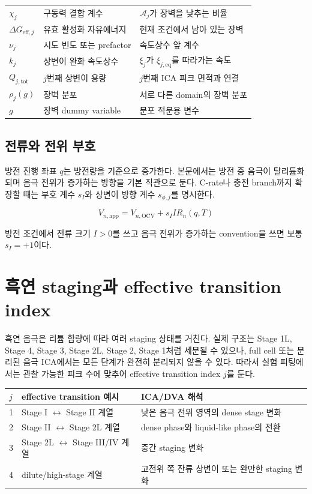\documentclass[11pt,a4paper]{article}
\newcommand{\OCV}{\mathrm{OCV}}
\newcommand{\app}{\mathrm{app}}
\newcommand{\eff}{\mathrm{eff}}
\newcommand{\eq}{\mathrm{eq}}
\newcommand{\tot}{\mathrm{tot}}
\begin{document}
\begin{longtable}{p{}p{}p{}}
\(\chi_j\) & 구동력 결합 계수 & \(\mathcal A_j\)가 장벽을 낮추는 비율 \\
\(\Delta G_{\eff,j}\) & 유효 활성화 자유에너지 & 현재 조건에서 남아 있는 장벽 \\
\(\nu_j\) & 시도 빈도 또는 prefactor & 속도상수 앞 계수 \\
\(k_j\) & 상변이 완화 속도상수 & \(\xi_j\)가 \(\xi_{j,\eq}\)를 따라가는 속도 \\
\(Q_{j,\tot}\) & \(j\)번째 상변이 용량 & \(j\)번째 ICA 피크 면적과 연결 \\
\(\rho_j(g)\) & 장벽 분포 & 서로 다른 domain의 장벽 분포 \\
\(g\) & 장벽 dummy variable & 분포 적분용 변수 \\
\bottomrule
\end{longtable}

\subsection{전류와 전위 부호}
방전 진행 좌표 \(q\)는 방전량을 기준으로 증가한다. 본문에서는 방전 중 음극이 탈리튬화되며 음극 전위가 증가하는 방향을 기본 직관으로 둔다. C-rate나 충전 branch까지 확장할 때는 부호 계수 \(s_I\)와 상변이 방향 계수 \(s_{\phi,j}\)를 명시한다.

\begin{equation}
V_{n,\app}=V_{n,\OCV}+s_IIR_n(q,T)
\label{eq:Vapp_general}
\end{equation}

방전 조건에서 전류 크기 \(I>0\)를 쓰고 음극 전위가 증가하는 convention을 쓰면 보통 \(s_I=+1\)이다.

\section{흑연 staging과 effective transition index}
흑연 음극은 리튬 함량에 따라 여러 staging 상태를 거친다. 실제 구조는 Stage 1L, Stage 4, Stage 3, Stage 2L, Stage 2, Stage 1처럼 세분될 수 있으나, full cell 또는 분리된 음극 ICA에서는 모든 단계가 완전히 분리되지 않을 수 있다. 따라서 실험 피팅에서는 관찰 가능한 피크 수에 맞추어 effective transition index \(j\)를 둔다.

\begin{longtable}{p{}p{}p{}}
\toprule
\(j\) & effective transition 예시 & ICA/DVA 해석 \\
\midrule
\endhead
1 & Stage I \(\leftrightarrow\) Stage II 계열 & 낮은 음극 전위 영역의 dense stage 변화 \\
2 & Stage II \(\leftrightarrow\) Stage 2L 계열 & dense phase와 liquid-like phase의 전환 \\
3 & Stage 2L \(\leftrightarrow\) Stage III/IV 계열 & 중간 staging 변화 \\
4 & dilute/high-stage 계열 & 고전위 쪽 잔류 상변이 또는 완만한 staging 변화 \\
\bottomrule
\end{longtable}
\end{document}
